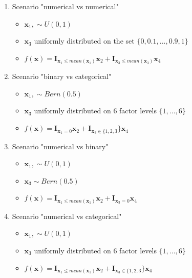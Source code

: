 \begin{enumerate}
    \item Scenario "numerical vs numerical"
    \begin{itemize}
        \item $\textbf{x}_{1}, \sim U(0,1)$
        \item $\textbf{x}_3$ uniformly distributed on the set $\{0, 0.1,..., 0.9, 1\}$
        \item $f(\textbf{x})= \mathbf{I}_{\textbf{x}_1 \leq  mean(\textbf{x}_1)}\textbf{x}_2  +  \mathbf{I}_{\textbf{x}_3 \leq  mean(\textbf{x}_3)}\textbf{x}_4 $        
    \end{itemize}

    \item Scenario "binary vs categorical"
    \begin{itemize}
        \item $\textbf{x}_{1}, \sim Bern(0.5)$
        \item $\textbf{x}_3$ uniformly distributed on 6 factor levels 
        $\{1,...,6\}$
        \item $f(\textbf{x})= \mathbf{I}_{\textbf{x}_1 = 0}\textbf{x}_2  +  \mathbf{I}_{\textbf{x}_3 \in \{1,2,3}\}\textbf{x}_4 $        
    \end{itemize}

    \item Scenario "numerical vs binary"
    \begin{itemize}
        \item $\textbf{x}_{1}, \sim U(0,1)$
        \item $\textbf{x}_3 \sim Bern(0.5)$ 
        \item $f(\textbf{x})= \mathbf{I}_{\textbf{x}_1 \leq  mean(\textbf{x}_1)}\textbf{x}_2  +  \mathbf{I}_{\textbf{x}_3 = 0}\textbf{x}_4 $        
    \end{itemize}

    \item Scenario "numerical vs categorical"
    \begin{itemize}
        \item $\textbf{x}_{1}, \sim U(0,1)$
        \item $\textbf{x}_3$ uniformly distributed on 6 factor levels 
        $\{1,...,6\}$
        \item $f(\textbf{x})= \mathbf{I}_{\textbf{x}_1 \leq  mean(\textbf{x}_1)}\textbf{x}_2  +  \mathbf{I}_{\textbf{x}_3 \in \{1,2,3}\}\textbf{x}_4 $        
    \end{itemize}

    
\end{enumerate}

